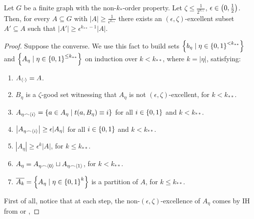     \begin{lemma}[Claim 5.4] \label{lem:existance_of_excellent_subsets}
        Let $G$ be a finite graph with the non-$k_{*}$-order property.
        Let $\zeta \leq \frac{1}{2^{k_{**}}}$, $\epsilon \in \left( 0, \frac{1}{2} \right)$.
        Then, for every $A \subseteq G$ with $|A| \geq \frac{1}{\epsilon^{k_{**}}}$ there exists an $(\epsilon, \zeta)$-excellent
        subset $A' \subseteq A$ such that $|A'| \geq \epsilon^{k_{**}-1} |A|$.
        \begin{proof}
            Suppose the converse.
            We use this fact to build sets $\left\{ b_\eta \mid \eta \in \left\{ 0,1 \right\}^{<k_{**}} \right\}$ and
            $\left\{ A_\eta \mid \eta \in \left\{ 0,1 \right\}^{\leq k_{**}} \right\}$ on induction over $k<k_{**}$, where $k = |\eta|$,
            satisfying:
            \begin{enumerate}
                \item\label{itm:existance_of_excellent_subsets.1} $A_{\left< \cdot \right>} = A$.
                \item\label{itm:existance_of_excellent_subsets.2} $B_\eta$ is a $\zeta$-good set witnessing that $A_\eta$ is not
                    $(\epsilon, \zeta)$-excellent, for $k < k_{**}$.
                \item\label{itm:existance_of_excellent_subsets.3} $A_{\eta \frown \left< i \right>} = \left\{ a \in A_\eta \mid t(a, B_\eta) \equiv i \right\}$
                    for all $i \in \left\{ 0,1 \right\}$ and $k < k_{**}$.
                \item\label{itm:existance_of_excellent_subsets.4} $\left| A_{\eta \frown \left< i \right>} \right| \geq \epsilon |A_\eta|$
                    for all $i \in \left\{ 0,1 \right\}$ and $k < k_{**}$.
                \item\label{itm:existance_of_excellent_subsets.5} $|A_\eta| \geq \epsilon^k |A|$, for $k \leq k_{**}$.
                \item\label{itm:existance_of_excellent_subsets.6} $A_\eta = A_{\eta \frown \left< 0 \right>} \sqcup A_{\eta \frown \left< 1 \right>}$,
                    for $k < k_{**}$.
                \item\label{itm:existance_of_excellent_subsets.7} $\overline{A_k} = \left\{ A_\eta \mid \eta \in \left\{ 0,1 \right\}^k \right\}$ is a partition of $A$,
                    for $k \leq k_{**}$.
            \end{enumerate}
            First of all, notice that at each step, the non-$(\epsilon, \zeta)$-excellence of $A_\eta$ comes by IH
            from  or ,

\end{proof}
\end{lemma}
